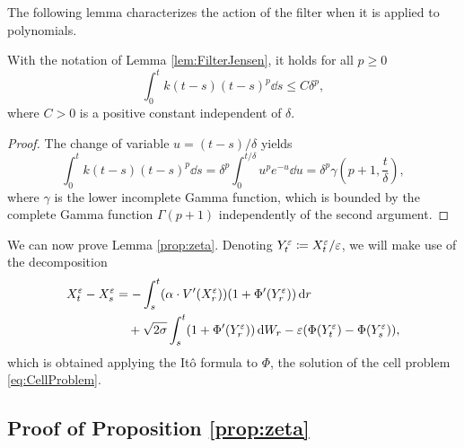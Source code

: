 \documentclass[10pt]{article}
\begin{document}
\begin{appendices}
The following lemma characterizes the action of the filter when it is applied to polynomials.
\begin{lemma}\label{lem:FilterPoly} With the notation of Lemma \ref{lem:FilterJensen}, it holds for all $p \geq 0$
	\begin{equation}
		\int_0^t k(t-s)(t-s)^p \dd s \leq C \delta^p,
	\end{equation}
	where $C > 0$ is a positive constant independent of $\delta$.
\end{lemma}
\begin{proof} The change of variable $u = (t-s)/\delta$ yields
	\begin{equation}
		\int_0^t k(t-s)(t-s)^p \dd s = \delta^p \int_0^{t/\delta} u^p e^{-u} \dd u = \delta^p \gamma\left(p+1, \frac{t}{\delta}\right),
	\end{equation}
	where $\gamma$ is the lower incomplete Gamma function, which is bounded by the complete Gamma function $\Gamma(p+1)$ independently of the second argument.
\end{proof}


We can now prove Lemma \ref{prop:zeta}. Denoting $Y_t^\varepsilon \coloneqq X_t^\varepsilon/\varepsilon$, we will make use of the decomposition
\cite[Formula 5.8]{PaS07}
\begin{equation}\label{eq:App_DiffXtXs}
\begin{aligned}
	X_t^\varepsilon - X_s^\varepsilon &= -\int_s^t (\alpha \cdot V'(X_r^\varepsilon))(1 + \Phi'(Y^\varepsilon_r)) \,\mathrm{d} r\\
	&\quad +\sqrt{2\sigma} \int_s^t (1 + \Phi'(Y_r^\varepsilon)) \,\mathrm{d} W_r - \varepsilon(\Phi(Y^\varepsilon_t)-\Phi(Y^\varepsilon_s)),
\end{aligned}
\end{equation}
which is obtained applying the Itô formula to $\Phi$, the solution of the cell problem \eqref{eq:CellProblem}. 

\subsection{Proof of Proposition \ref{prop:zeta}}


\end{appendices}
\end{document}
